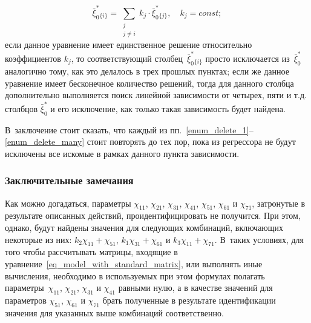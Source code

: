 \begin{enumerate}
    \begin{equation}
        \bar\xi_0^*{}_{\{i\}} = \sum_{\substack{j\\j\ne i}} k_j \cdot \bar\xi_0^*{}_{\{j\}}, \quad k_j = const;
    \end{equation}
    если данное уравнение имеет единственное решение относительно коэффициентов $k_j$, то соответствующий столбец~$\bar\xi_0^*{}_{\{i\}}$ просто исключается из~$\bar\xi_0^*$ аналогично тому, как это делалось в трех прошлых пунктах; если же данное уравнение имеет бесконечное количество решений, тогда для данного столбца дополнительно выполняется поиск линейной зависимости от четырех, пяти и т.д. столбцов $\bar\xi_0^*$ и его исключение, как только такая зависимость будет найдена.
\end{enumerate}
В~заключение стоит сказать, что каждый из пп.~\ref{enum_delete_1}--\ref{enum_delete_many} стоит повторять до тех пор, пока из регрессора не будут исключены все искомые в рамках данного пункта зависимости.

\subsubsection{Заключительные замечания}
Как можно догадаться, параметры $\chi_{11}$, $\chi_{21}$, $\chi_{31}$, $\chi_{41}$, $\chi_{51}$, $\chi_{61}$ и $\chi_{71}$, затронутые в результате описанных действий, проидентифицировать не получится. При этом, однако, будут найдены значения для следующих комбинаций, включающих некоторые из них: $k_2\chi_{11} + \chi_{51}$, $k_1\chi_{31} + \chi_{61}$ и $k_3\chi_{11} + \chi_{71}$.
В~таких условиях, для того чтобы рассчитывать матрицы, входящие в уравнение~\eqref{eq_model_with_standard_matrix}, или выполнять иные вычисления, необходимо в используемых при этом формулах полагать параметры~$\chi_{11}$, $\chi_{21}$, $\chi_{31}$ и $\chi_{41}$ равными нулю, а в качестве значений для параметров $\chi_{51}$, $\chi_{61}$ и $\chi_{71}$ брать полученные в результате идентификации значения для указанных выше комбинаций соответственно.



